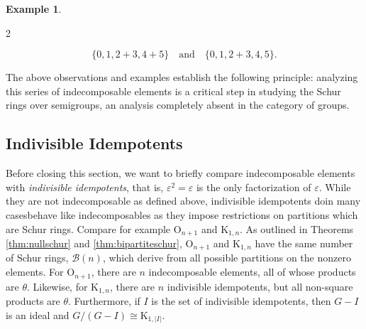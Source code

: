 \documentclass{article}
\theoremstyle{plain}
\theoremstyle{definition}
\newtheorem{Exam}[Thm]{Example}
\renewcommand{\S}{\mathcal{S}}
\newcommand{\I}{\mathscr{I}}
\newcommand{\B}{\mathscr{B}}
\renewcommand{\O}{\mathrm{O}}
\newcommand{\K}{\mathrm{K}}
\newcommand{\LO}{\mathrm{LO}}
\newcommand{\LOO}{\mathrm{LOO}}
\begin{document}
\begin{Exam}
\begin{multicols}{2}
\begin{center}
\end{center}
\end{multicols}\vspace{-15pt}
\[\{ 0,1,2+3,4+5 \}\quad \text{and}\quad\{ 0,1,2+3,4,5 \}.\] %
\end{Exam}

The above observations and examples establish the following principle: analyzing this series of indecomposable elements is a critical step in studying the Schur rings over semigroups, an analysis completely absent in the category of groups.

\subsection{Indivisible Idempotents}\label{sec:idempotent}
Before closing this section, we want to briefly compare indecomposable elements with \emph{indivisible idempotents}, that is, $\varepsilon^2 = \varepsilon$ is the only factorization of $\varepsilon$.  While they are not indecomposable as defined above, indivisible idempotents do\textemdash in many cases\textemdash behave like indecomposables as they impose restrictions on partitions which are Schur rings. Compare for example $\O_{n+1}$ and $\K_{1,n}$. As outlined in Theorems \ref{thm:nullschur} and \ref{thm:bipartiteschur}, $\O_{n+1}$ and $\K_{1,n}$ have the same number of Schur rings, $\B(n)$, which derive from all possible partitions on the nonzero elements. For $\O_{n+1}$, there are $n$ indecomposable elements, all of whose products are $\theta$. Likewise, for $\K_{1,n}$, there are $n$ indivisible idempotents, but all non-square products are $\theta$. Furthermore, if $I$ is the set of indivisible idempotents, then $G-I$ is an ideal and $G/(G-I)\cong \K_{1,|I|}$. 
\end{document}
